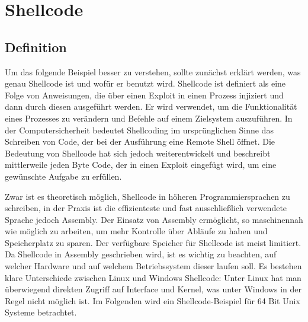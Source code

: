 \section{Shellcode} \label{sec:shellcode}
\subsection{Definition}
Um das folgende Beispiel besser zu verstehen, sollte zunächst erklärt werden, was genau Shellcode ist und wofür er benutzt wird.
Shellcode ist definiert als eine Folge von Anweisungen, die über einen Exploit in einen Prozess injiziert und
dann durch diesen ausgeführt werden. Er wird verwendet, um die Funktionalität eines Prozesses zu verändern und
Befehle auf einem Zielsystem auszuführen. In der Computersicherheit bedeutet Shellcoding im ursprünglichen Sinne
das Schreiben von Code, der bei der Ausführung eine Remote Shell öffnet. Die Bedeutung von Shellcode hat sich jedoch weiterentwickelt und
beschreibt mittlerweile jeden Byte Code, der in einen Exploit eingefügt wird, um eine gewünschte Aufgabe zu erfüllen.

Zwar ist es theoretisch möglich, Shellcode in höheren Programmiersprachen zu schreiben, in der Praxis ist die effizienteste und
fast ausschließlich verwendete Sprache jedoch Assembly. Der Einsatz von Assembly ermöglicht, so maschinennah wie möglich zu arbeiten,
um mehr Kontrolle über Abläufe zu haben und Speicherplatz zu sparen. Der verfügbare Speicher für Shellcode ist meist limitiert.
Da Shellcode in Assembly geschrieben wird, ist es wichtig zu beachten, auf welcher Hardware und auf welchem Betriebssystem dieser laufen soll.
Es bestehen klare Unterschiede zwischen Linux und Windows Shellcode: Unter Linux hat man überwiegend direkten Zugriff auf Interface und Kernel,
was unter Windows in der Regel nicht möglich ist. Im Folgenden wird ein Shellcode-Beispiel für 64 Bit Unix Systeme betrachtet. \cite{tutorial1}

